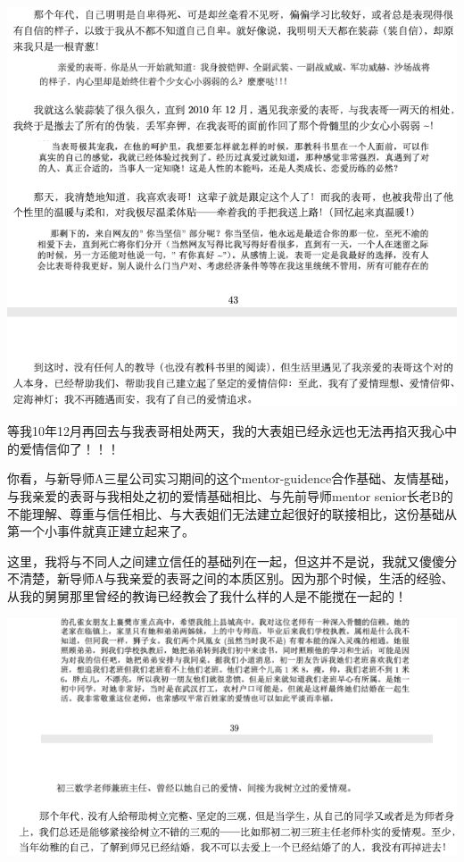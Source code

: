 \documentclass[9pt, b5paper]{article}
\begin{document}
\begin{center}
\includegraphics[width=.9\linewidth]{./pic/backups_plans_20210511_121521.png}
\end{center}

等我10年12月再回去与我表哥相处两天，我的大表姐已经永远也无法再掐灭我心中的爱情信仰了！！！

你看，与新导师A三星公司实习期间的这个mentor-guidence合作基础、友情基础，与我亲爱的表哥与我相处之初的爱情基础相比、与先前导师mentor senior长老B的不能理解、尊重与信任相比、与大表姐们无法建立起很好的联接相比，这份基础从第一个小事件就真正建立起来了。 

这里，我将与不同人之间建立信任的基础列在一起，但这并不是说，我就又傻傻分不清楚，新导师A与我亲爱的表哥之间的本质区别。因为那个时候，生活的经验、从我的舅舅那里曾经的教诲已经教会了我什么样的人是不能搅在一起的！

\begin{center}
\includegraphics[width=.9\linewidth]{./pic/backups_plans_20210511_122404.png}
\end{center}
\end{document}
